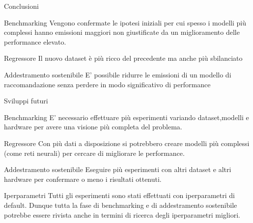 \begin{frame}{Conclusioni}
    \begin{block}{Benchmarking}
        Vengono confermate le ipotesi iniziali per cui spesso i modelli più complessi hanno emissioni maggiori non giustificate da un miglioramento delle performance elevato.
    \end{block}
    \begin{block}{Regressore}
        Il nuovo dataset è più ricco del precedente ma anche più sbilanciato
    \end{block}
    \begin{block}{Addestramento sostenibile}
        E' possibile ridurre le emissioni di un modello di raccomandazione senza perdere in modo significativo di performance
    \end{block}
\end{frame}



\begin{frame}{Sviluppi futuri}
    \scriptsize
    \begin{block}{Benchmarking}
        E’ necessario effettuare più esperimenti variando dataset,modelli e hardware per avere una visione più completa del problema.
    \end{block}
    \begin{block}{Regressore}
        Con più dati a disposizione si potrebbero creare modelli più complessi (come reti neurali) per cercare di migliorare le performance.
    \end{block}
    \begin{block}{Addestramento sostenibile}
        Eseguire più esperimenti con altri dataset e altri hardware per confermare o meno i risultati ottenuti.
    \end{block}
    \begin{block}{Iperparametri}
        Tutti gli esperimenti sono stati effettuati con iperparametri di default. Dunque tutta la fase di benchmarking e di addestramento sostenibile potrebbe essere rivista anche in termini di ricerca degli iperparametri migliori.
    \end{block}
\end{frame}
